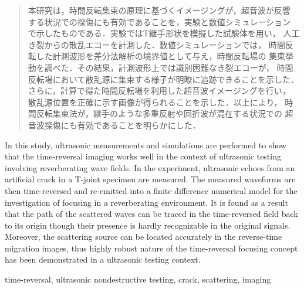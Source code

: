 ﻿\documentclass{jjsce}
\begin{document}

\begin{abstract}
本研究は，時間反転集束の原理に基づくイメージングが，超音波が反響
する状況での探傷にも有効であることを，実験と数値シミュレーション
で示したものである．実験ではT継手形状を模擬した試験体を用い，
人工き裂からの散乱エコーを計測した．数値シミュレーションでは，
時間反転した計測波形を差分法解析の境界値として与え，時間反転場の
集束挙動を調べた．その結果，計測波形上では識別困難なき裂エコーが，
時間反転場において散乱源に集束する様子が明瞭に追跡できることを示した．
さらに，計算で得た時間反転場を利用した超音波イメージングを行い，
散乱源位置を正確に示す画像が得られることを示した．以上により，
時間反転集束法が，継手のような多重反射や回折波が混在する状況での
超音波探傷にも有効であることを明らかにした．
\end{abstract}
\begin{Eabstract}
In this study, ultrasonic measurements and simulations are performed to show 
that the time-reversal imaging works well in the context of ultrasonic testing 
involving reverberating wave fields. In the experiment, ultrasonic echoes from 
an artificial crack in a T-joint specimen are measured. The measured waveforms 
are then time-reversed and re-emitted into a finite difference numerical 
model for the investigation of focusing in a reverberating environment.
It is found as a result that the path of the scattered waves can be traced 
in the time-reversed field back to its origin though their presence is hardly 
recognizable in the original signals. Moreover, the scattering source 
can be located accurately in the reverse-time migration images, 
thus highly robust nature of the time-reversal focusing concept has 
been demonstrated in a ultrasonic testing context.
\end{Eabstract}
\begin{keyword}
time-reversal, ultrasonic nondestructive testing, crack, scattering, imaging
\end{keyword}
\maketitle
\end{document}
